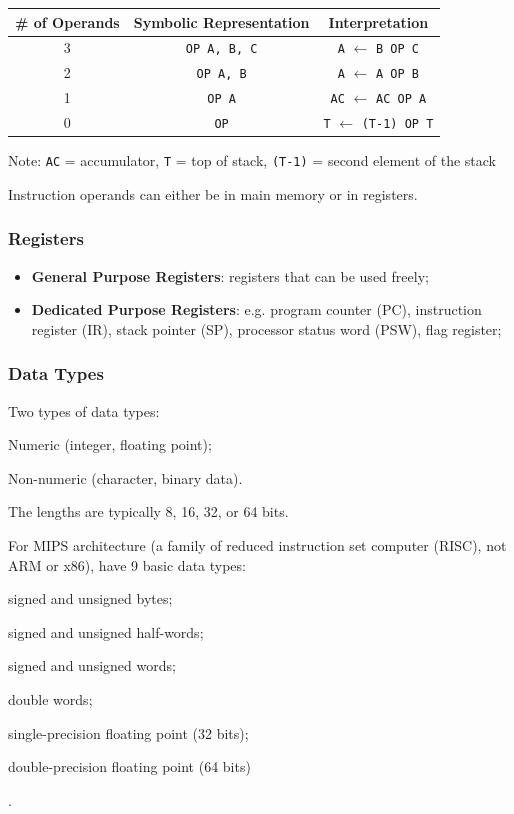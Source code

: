 \begin{table}[H]
    \centering
    \begin{tabular}{|c|c|c|}
        \hline
        \textbf{\# of Operands} & \textbf{Symbolic Representation} & \textbf{Interpretation} \\
        \hline
        3 & \texttt{OP A, B, C} & \texttt{A} $\gets$ \texttt{B OP C} \\
        2 & \texttt{OP A, B} & \texttt{A} $\gets$ \texttt{A OP B} \\
        1 & \texttt{OP A} & \texttt{AC} $\gets$ \texttt{AC OP A} \\
        0 & \texttt{OP} & \texttt{T} $\gets$ \texttt{(T-1) OP T} \\
        \hline
    \end{tabular}
\end{table}

{\footnotesize Note: 
\texttt{AC} = accumulator, \texttt{T} = top of stack, \texttt{(T-1)} = second element of the stack
}

Instruction operands can either be in main memory or in registers.

\subsubsection{Registers}

\begin{itemize}
    \item \textbf{General Purpose Registers}: registers that can be used freely;
    \item \textbf{Dedicated Purpose Registers}: e.g. program counter (PC), instruction register (IR), stack pointer (SP), processor status word (PSW), flag register;
\end{itemize}

\subsubsection{Data Types}

Two types of data types: \begin{enumerate*}[label=\textbf{(\arabic*)}]
    \item Numeric (integer, floating point);
    \item Non-numeric (character, binary data).
\end{enumerate*}
The lengths are typically 8, 16, 32, or 64 bits.

For MIPS architecture (a family of reduced instruction set computer (RISC), not ARM or x86),
have 9 basic data types: \begin{enumerate*}[label=\textbf{(\arabic*)}]
    \item signed and unsigned bytes;
    \item signed and unsigned half-words;
    \item signed and unsigned words;
    \item double words;
    \item single-precision floating point (32 bits);
    \item double-precision floating point (64 bits)
\end{enumerate*}.

